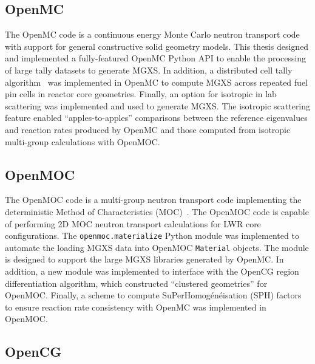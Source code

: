 \documentclass[12pt,twoside]{mitthesis-exec}
\begin{document}
\subsection*{OpenMC}

The OpenMC code is a continuous energy Monte Carlo neutron transport code~\cite{romano2013openmc} with support for general constructive solid geometry models. This thesis designed and implemented a fully-featured OpenMC Python API to enable the processing of large tally datasets to generate MGXS. In addition, a distributed cell tally algorithm~\cite{lax2014distribcell} was implemented in OpenMC to compute MGXS across repeated fuel pin cells in reactor core geometries. Finally, an option for isotropic in lab scattering was implemented and used to generate MGXS. The isotropic scattering feature enabled ``apples-to-apples'' comparisons between the reference eigenvalues and reaction rates produced by OpenMC and those computed from isotropic multi-group calculations with OpenMOC. 


\subsection*{OpenMOC}

The OpenMOC code is a multi-group neutron transport code implementing the deterministic Method of Characteristics (MOC)~\cite{boyd2014openmoc}. The OpenMOC code is capable of performing 2D MOC neutron transport calculations for LWR core configurations. The \texttt{openmoc.materialize} Python module was implemented to automate the loading MGXS data into OpenMOC \texttt{Material} objects. The module is designed to support the large MGXS libraries generated by OpenMC. In addition, a new module was implemented  to interface with the OpenCG region differentiation algorithm, which constructed ``clustered geometries'' for OpenMOC. Finally, a scheme to compute SuPerHomog\'{e}n\'{e}isation (SPH) factors to ensure reaction rate consistency with OpenMC was implemented in OpenMOC. 


\subsection*{OpenCG}
\end{document}
